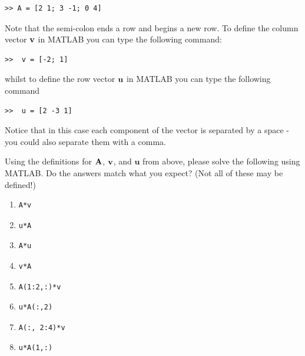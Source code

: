 \begin{verbatim}
>> A = [2 1; 3 -1; 0 4]
\end{verbatim}
Note that the semi-colon ends a row and begins a new row. To define the column vector $\mathbf{v}$ in MATLAB you can type the following command:
\begin{verbatim}
>>  v = [-2; 1]
\end{verbatim}
whilst to define the row vector $\mathbf{u}$ in MATLAB you can type the following command
\begin{verbatim}
>>  u = [2 -3 1]
\end{verbatim}
Notice that in this case each component of the vector is separated by a space - you could also separate them with a comma.

\begin{prob}
Using the definitions for $\mathbf{A}$, $\mathbf{v}$, and $\mathbf{u}$ from above, please solve the following using MATLAB. Do the answers match what you expect? (Not all of these may be defined!)

\begin{enumerate}
    \item 
\begin{verbatim}
A*v
\end{verbatim}
\item
\begin{verbatim}
u*A
\end{verbatim}
\item 
\begin{verbatim}
A*u
\end{verbatim}
\item 
\begin{verbatim}
v*A
\end{verbatim}
\item 
\begin{verbatim}
A(1:2,:)*v
\end{verbatim}
\item 
\begin{verbatim}
u*A(:,2)
\end{verbatim}
\item 
\begin{verbatim}
A(:, 2:4)*v
\end{verbatim}
\item 
\begin{verbatim}
u*A(1,:)
\end{verbatim}
\end{enumerate}
\end{prob}


